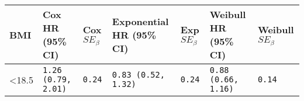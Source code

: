 \documentclass[]{article}
\begin{document}
\begin{longtable}[]{@{}lllllll@{}}
\toprule
\begin{minipage}[b]{0.10\columnwidth}\raggedright\strut
BMI\strut
\end{minipage} & \begin{minipage}[b]{0.19\columnwidth}\raggedright\strut
Cox HR (95\% CI)\strut
\end{minipage} & \begin{minipage}[b]{0.05\columnwidth}\raggedright\strut
Cox \(SE_\beta\)\strut
\end{minipage} & \begin{minipage}[b]{0.19\columnwidth}\raggedright\strut
Exponential HR (95\% CI)\strut
\end{minipage} & \begin{minipage}[b]{0.05\columnwidth}\raggedright\strut
Exp \(SE_\beta\)\strut
\end{minipage} & \begin{minipage}[b]{0.19\columnwidth}\raggedright\strut
Weibull HR (95\% CI)\strut
\end{minipage} & \begin{minipage}[b]{0.05\columnwidth}\raggedright\strut
Weibull \(SE_\beta\)\strut
\end{minipage}\tabularnewline
\midrule
\endhead
\begin{minipage}[t]{0.10\columnwidth}\raggedright\strut
\textless{}18.5\strut
\end{minipage} & \begin{minipage}[t]{0.19\columnwidth}\raggedright\strut
\tt{1.26} (\tt{0.79}, \tt{2.01})\strut
\end{minipage} & \begin{minipage}[t]{0.05\columnwidth}\raggedright\strut
\tt{0.24}\strut
\end{minipage} & \begin{minipage}[t]{0.19\columnwidth}\raggedright\strut
\tt{0.83} (\tt{0.52}, \tt{1.32})\strut
\end{minipage} & \begin{minipage}[t]{0.05\columnwidth}\raggedright\strut
\tt{0.24}\strut
\end{minipage} & \begin{minipage}[t]{0.19\columnwidth}\raggedright\strut
\tt{0.88} (\tt{0.66}, \tt{1.16})\strut
\end{minipage} & \begin{minipage}[t]{0.05\columnwidth}\raggedright\strut
\tt{0.14}\strut
\end{minipage}\tabularnewline

\end{longtable}
\end{document}
